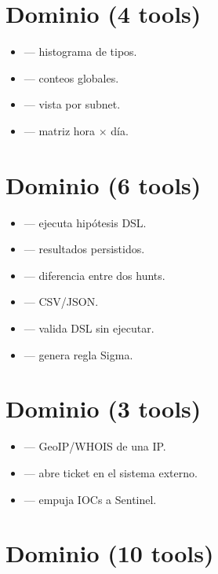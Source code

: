 \section{Dominio  (4 tools)}

\begin{itemize}
    \item {} — histograma de tipos.
    \item {} — conteos globales.
    \item {} — vista por subnet.
    \item {} — matriz hora $\times$ día.
\end{itemize}

\section{Dominio  (6 tools)}

\begin{itemize}
    \item {} — ejecuta hipótesis DSL.
    \item {} — resultados persistidos.
    \item {} — diferencia entre dos hunts.
    \item {} — CSV/JSON.
    \item {} — valida DSL sin ejecutar.
    \item {} — genera regla Sigma.
\end{itemize}

\section{Dominio  (3 tools)}

\begin{itemize}
    \item {} — GeoIP/WHOIS de una IP.
    \item {} — abre ticket en el sistema externo.
    \item {} — empuja IOCs a Sentinel.
\end{itemize}

\section{Dominio  (10 tools)}


